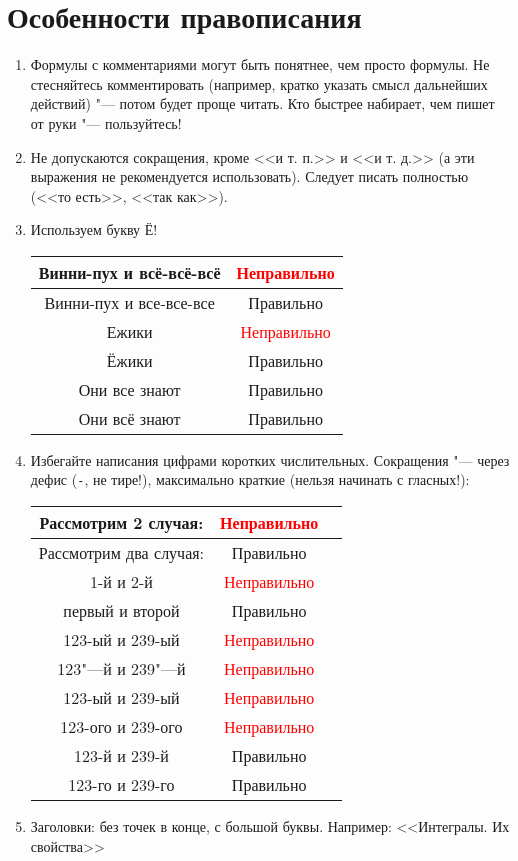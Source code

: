 \documentclass[12pt,a4paper]{book}
\newcommand{\ok}{& \textcolor{green!60!black}{Правильно}}
\newcommand{\bad}{& \textcolor{red}{Неправильно}}
\begin{document}
\section{Особенности правописания}

\begin{enumerate}
\item
	Формулы с комментариями могут быть понятнее, чем просто формулы.
	Не стесняйтесь комментировать (например, кратко указать смысл
	дальнейших действий) "--- потом будет проще читать.
	Кто быстрее набирает, чем пишет от руки "--- пользуйтесь!

\item
	Не допускаются сокращения, кроме <<и т. п.>> и <<и т. д.>> (а эти выражения не рекомендуется использовать).
	Следует писать полностью (<<то есть>>, <<так как>>).
	
\item Используем букву Ё!
	\begin{center}\begin{tabular}{|c|c|}
		\hline Винни-пух и всё-всё-всё \bad \\
		\hline Винни-пух и все-все-все \ok \\
		\hline Ежики \bad \\
		\hline Ёжики \ok \\
		\hline Они все знают \ok \\
		\hline Они всё знают \ok \\
		\hline
	\end{tabular}\end{center}

\item
	Избегайте написания цифрами коротких числительных.
	Сокращения "--- через дефис (\verb!-!, не тире!), максимально краткие (нельзя начинать с гласных!):
	\begin{center}\begin{tabular}{|c|c|c|}
		\hline Рассмотрим 2 случая: \bad \\
		\hline Рассмотрим два случая: \ok \\
		\hline 1-й и 2-й \bad \\
		\hline первый и второй \ok\\
		\hline 123-ый и 239-ый \bad \\
		\hline 123"---й и 239"---й \bad \\
		\hline 123-ый и 239-ый \bad \\
		\hline 123-ого и 239-ого \bad \\
		\hline 123-й и 239-й \ok \\
		\hline 123-го и 239-го \ok \\
		\hline
	\end{tabular}\end{center}

\item
	Заголовки: без точек в конце, с большой буквы. Например: <<Интегралы. Их свойства>>
\end{enumerate}
\end{document}
